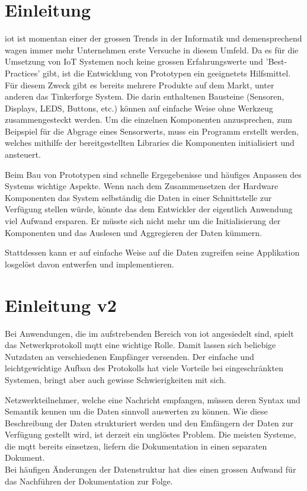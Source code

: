 \chapter{Einleitung}
\label{chap:einleitung}


\acrfull{iot} ist momentan einer der grossen Trends in der Informatik und demensprechend wagen immer mehr Unternehmen erste Versuche in diesem Umfeld. Da es für die Umsetzung von IoT Systemen noch keine grossen Erfahrungswerte und 'Best-Practices' gibt, ist die Entwicklung von Prototypen ein geeignetets Hilfsmittel. Für diesem Zweck gibt es bereits mehrere Produkte auf dem Markt, unter anderen das Tinkerforge System. Die darin enthaltenen Bausteine (Sensoren, Displays, LEDS, Buttons, etc.) können auf einfache Weise ohne Werkzeug zusammengesteckt werden. 
Um die einzelnen Komponenten anzusprechen, zum Beipspiel für die Abgrage eines Sensorwerts, muss ein Programm erstellt werden, welches mithilfe der bereitgestellten Libraries die Komponenten initialisiert und ansteuert.

Beim Bau von Prototypen sind schnelle Ergegebenisse und häufiges Anpassen des Systems wichtige Aspekte. Wenn nach dem Zusammensetzen der Hardware Komponenten das System selbständig die Daten in einer Schnittstelle zur Verfügung stellen würde, könnte das dem Entwickler der eigentlich Anwendung viel Aufwand ersparen. Er müsste sich nicht mehr um die Initialisierung der Komponenten und das Auslesen und Aggregieren der Daten kümmern.

Stattdessen kann er auf einfache Weise auf die Daten zugreifen seine Applikation losgelöst davon entwerfen und implementieren. 



\chapter{Einleitung v2}
Bei Anwendungen, die im aufstrebenden Bereich von \acrfull{iot} angesiedelt sind, spielt das Netwerkprotokoll \Gls{mqtt} eine wichtige Rolle. Damit lassen sich beliebige Nutzdaten an verschiedenen Empfänger versenden. Der einfache und leichtgewichtige Aufbau des Protokolls hat viele Vorteile bei eingeschränkten Systemen, bringt aber auch gewisse Schwierigkeiten mit sich.

Netzwerkteilnehmer, welche eine Nachricht empfangen, müssen deren Syntax und Semantik kennen um die Daten sinnvoll auswerten zu können. Wie diese Beschreibung der Daten strukturiert werden und den Emfängern der Daten zur Verfügung gestellt wird, ist derzeit ein unglöstes Problem. Die meisten Systeme, die \Gls{mqtt} bereits einsetzen, liefern die Dokumentation in einen separaten Dokument. \\
Bei häufigen Änderungen der Datenstruktur hat dies einen grossen Aufwand für das Nachführen der Dokumentation zur Folge.

